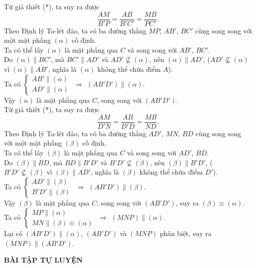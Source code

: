 \begin{vd}
{		\noindent Từ giả thiết (*), ta suy ra được $$\dfrac{AM}{B'P}=\dfrac{AB}{B'C'}=\dfrac{MB}{PC'}.$$
		Theo Định lý Ta-lét đảo, ta có ba đường thẳng $MP$, $AB'$, $BC'$ cùng song song với một mặt phẳng $(\alpha)$ cố định.\\
		Ta có thể lấy $(\alpha)$ là mặt phẳng qua $C$ và song song với $AB'$, $BC'$.\\
		Do $(\alpha) \parallel BC'$, mà $BC' \parallel AD'$ và $AD' \nsubseteq (\alpha)$, nên $(\alpha) \parallel AD'$, ($AD' \nsubseteq (\alpha)$ vì $(\alpha) \parallel AB'$, nghĩa là $(\alpha)$ không thể chứa điểm $A$).\\
		Ta có $\begin{cases} AB' \parallel (\alpha)\\ AD' \parallel (\alpha) \end{cases}$ $\Rightarrow$ $(AB'D') \parallel (\alpha)$.\\
		Vậy $(\alpha)$ là mặt phẳng qua $C$, song song với $(AB'D')$.\\
		Từ giả thiết (*), ta suy ra được $$\dfrac{AM}{D'N}=\dfrac{AB}{D'D}=\dfrac{MB}{ND}.$$
		Theo Định lý Ta-lét đảo, ta có ba đường thẳng $AD'$, $MN$, $BD$ cùng song song với một mặt phẳng $(\beta)$ cố định.\\
		Ta có thể lấy $(\beta)$ là mặt phẳng qua $C$ và song song với $AD'$, $BD$.\\
		Do $(\beta) \parallel BD$, mà $BD \parallel B'D'$  và $B'D' \nsubseteq (\beta)$, nên $(\beta) \parallel B'D'$, ($B'D' \nsubseteq (\beta)$ vì $(\beta) \parallel AD'$, nghĩa là $(\beta)$ không thể chứa điểm $D'$).\\
		Ta có $\begin{cases} AD' \parallel (\beta)\\ B'D' \parallel (\beta) \end{cases}$ $\Rightarrow$ $(AB'D') \parallel (\beta)$.\\
		Vậy $(\beta)$ là mặt phẳng qua $C$, song song với $(AB'D')$, suy ra $(\beta) \equiv (\alpha)$.\\
		Ta có $\begin{cases} MP \parallel (\alpha)\\ MN \parallel (\beta) \equiv (\alpha) \end{cases}$ $\Rightarrow$ $(MNP) \parallel (\alpha)$.\\
		Lại có $(AB'D') \parallel (\alpha)$, $(AB'D')$ và $(MNP)$ phân biệt, suy ra $(MNP) \parallel (AB'D')$.
	}
\end{vd}

\begin{center}
	\textbf{BÀI TẬP TỰ LUYỆN}
\end{center}

